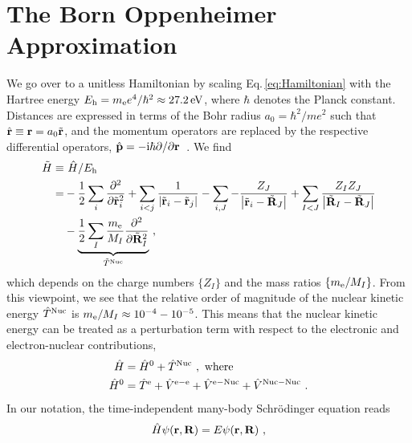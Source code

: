 \section{The Born Oppenheimer Approximation}
We go over to a unitless Hamiltonian by scaling Eq.\,\eqref{eq:Hamiltonian} with the Hartree energy $E_{\rm h} = m_{\rm e} e^4 / \hbar^2 \approx 27.2\,{\rm eV}$, where $\hbar$ denotes the Planck constant. Distances are expressed in terms of the Bohr radius $a_0 = \hbar^2 / m e^2$ such that~$\hat{\bf r} \equiv {\bf r} = a_0 \tilde{\bf r}$, and the momentum operators are replaced by the respective differential operators, $\hat{\bf p}=-{\rm i} \hbar \partial / \partial {\bf r}$~\cite{Czycholl}. We find
\begin{align}
\begin{split}
    \tilde H 
        \equiv& ~\hat{H} / E_{\rm h} \\
        =& 
        - \frac{1}{2} \sum_i \frac{\partial^2}{\partial \tilde{\bf r}_i^2}
        + \sum_{i < j} \frac{1}{\left|\tilde{\b r}_{i}-\tilde{\bf r}_{j}\right|}
        - \sum_{i, J} -\frac{Z_J}{\left|\tilde{\b r}_{i}-\tilde{\bf R}_{J}\right|}
        + \sum_{I < J} \frac{Z_{I} Z_{J}}{
            \left|\tilde{\b R}_{I}-\tilde{\bf R}_{J}\right|} 
        \\
        &- \underset{\tilde{T}^{\rm Nuc}}{\underbrace{\frac{1}{2} \sum_I \frac{m_{\rm e}}{M_I} \frac{\partial^2}{\partial \tilde{\bf R}_I^2}}}~,
    \label{eq:Hscaled}
\end{split}
\end{align}
which depends on the charge numbers $\{Z_I\}$ and the mass ratios $\{ m_{\rm e} / M_I \}$. From this viewpoint, we see that the relative order of magnitude of the nuclear kinetic energy $\hat{T}^{\rm Nuc}$ is \mbox{$m_{\rm e} / M_I \approx 10^{-4} - 10^{-5}$}. This means that the nuclear kinetic energy can be treated as a perturbation term with respect to the electronic and electron-nuclear contributions,
\begin{align}
    \hat{H}   &= \hat{H}^0 + \hat{T}^{\rm Nuc}~, \text{ where} 
    \label{eq:H=H0+T}
    \\
    \hat{H}^0 &=
          {\hat{T}}^{\mathrm{e}}
        + {\hat{V}}^{\mathrm{e}-\mathrm{e}}
        + {\hat{V}}^{\mathrm{e}-\mathrm{Nuc}}
        + {\hat{V}}^{\mathrm{Nuc}-\mathrm{Nuc}}~.
    \label{eq:H0}
\end{align}
In our notation, the time-independent many-body Schr\"odinger equation reads
\begin{align}
    \hat{H} \psi ({\bf r}, {\bf R}) = E \psi ({\bf r}, {\bf R})~,
    \label{eq:Schroedinger1}
\end{align}
